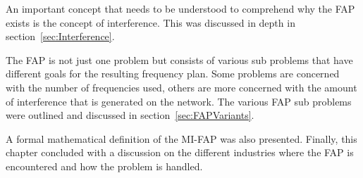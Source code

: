An important concept that needs to be understood to comprehend why the \gls{FAP} exists is the concept of interference. This was discussed in depth in section~\ref{sec:Interference}.

The \gls{FAP} is not just one problem but consists of various sub problems that have different goals for the resulting frequency plan. Some problems are concerned with the number of frequencies used, others are more concerned with the amount of interference that is generated on the network.
The various \gls{FAP} sub problems were outlined and discussed in section~\ref{sec:FAPVariants}.

A formal mathematical definition of the \gls{MI-FAP} was also presented. Finally, this chapter concluded with a discussion on the different industries where the FAP is encountered and how the problem is handled.
